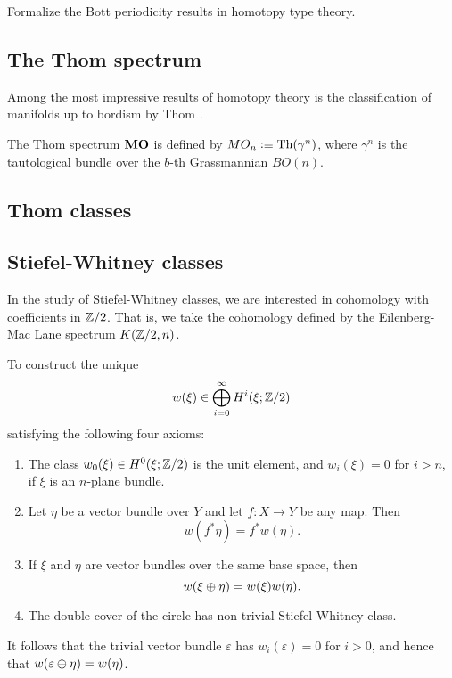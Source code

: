 \documentclass[reqno]{amsart}
\begin{document}
\begin{proposal}\label{p:bott_periodicity}
Formalize the Bott periodicity results in homotopy type theory.
\end{proposal}

\subsection{The Thom spectrum}
Among the most impressive results of homotopy theory is the classification 
of manifolds up to bordism by Thom \cite{Thom54}. 

The Thom spectrum $\mathbf{MO}$ is defined by $MO_n\vcentcolon\equiv\mathrm{Th}(\gamma^n)$,
where $\gamma^n$ is the tautological bundle over the $b$-th Grassmannian $BO(n)$.

\subsection{Thom classes}

\subsection{Stiefel-Whitney classes}
In the study of Stiefel-Whitney classes, we are interested in cohomology with
coefficients in $\mathbb{Z}/2$. That is, we take the cohomology defined by the 
Eilenberg-Mac Lane spectrum $K(\mathbb{Z}/2,n)$.

\begin{proposal}\label{p:stiefel_whitney_class}
To construct the unique
\begin{equation*}
w(\xi)\in \bigoplus_{i=0}^\infty H^i(\xi;\mathbb{Z}/2)
\end{equation*}
satisfying the following four axioms:
\begin{enumerate}
\item The class $w_0(\xi)\in H^0(\xi;\mathbb{Z}/2)$ is the unit element,
and $w_i(\xi)=0$ for $i>n$, if $\xi$ is an $n$-plane bundle. 
\item Let $\eta$ be a vector bundle over $Y$ and let $f:X\to Y$ be any map.
Then
\begin{equation*}
w(f^\ast\eta)=f^\ast w(\eta).
\end{equation*}
\item If $\xi$ and $\eta$ are vector bundles over the same base space, then 
\begin{equation*}
w(\xi\oplus \eta)=w(\xi)w(\eta).
\end{equation*}
\item The double cover of the circle has non-trivial Stiefel-Whitney class.
\end{enumerate}
It follows that the trivial vector bundle $\varepsilon$ has $w_i(\varepsilon)=0$ for $i>0$, and hence that $w(\varepsilon\oplus \eta)=w(\eta)$. 
\end{proposal}
\end{document}
